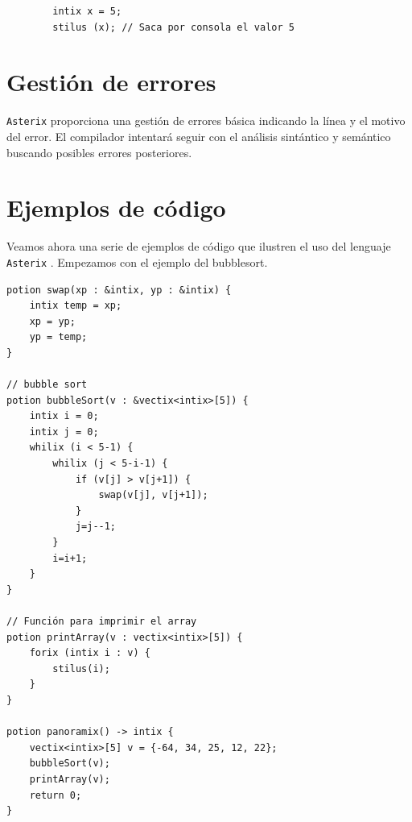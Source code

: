 \documentclass[a4paper, 10pt]{article}
\newcommand{\atx}{\texttt{Asterix} }
\begin{document}
    \begin{verbatim}
        intix x = 5;
        stilus (x); // Saca por consola el valor 5
    \end{verbatim}

    \section*{Gestión de errores}
    \atx proporciona una gestión de errores básica indicando la línea y el motivo
    del error. El compilador intentará seguir con el análisis sintántico y semántico
    buscando posibles errores posteriores.

    \section*{Ejemplos de código}
    Veamos ahora una serie de ejemplos de código que ilustren el uso del lenguaje
    \atx. Empezamos con el ejemplo del bubblesort.
    
    \begin{verbatim}
potion swap(xp : &intix, yp : &intix) {
    intix temp = xp;
    xp = yp;
    yp = temp;
}
 
// bubble sort
potion bubbleSort(v : &vectix<intix>[5]) {
    intix i = 0;
    intix j = 0;
    whilix (i < 5-1) {
        whilix (j < 5-i-1) {
            if (v[j] > v[j+1]) {
                swap(v[j], v[j+1]);
            }
            j=j--1;
        }
        i=i+1;
    }
}
 
// Función para imprimir el array 
potion printArray(v : vectix<intix>[5]) {
    forix (intix i : v) {
        stilus(i);
    }
}
 
potion panoramix() -> intix {
    vectix<intix>[5] v = {-64, 34, 25, 12, 22};
    bubbleSort(v);
    printArray(v);
    return 0;
}
    \end{verbatim}
    
\end{document}
